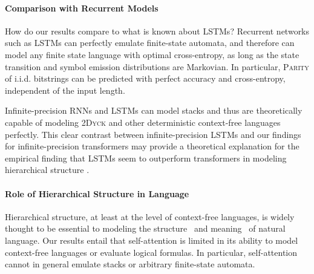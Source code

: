 \documentclass[11pt,a4paper]{article}
\begin{document}



\paragraph{Comparison with Recurrent Models}
How do our results compare to what is known about LSTMs?
Recurrent networks such as LSTMs can perfectly emulate finite-state automata, and therefore can model any finite state language with optimal cross-entropy, as long as the state transition and symbol emission distributions are Markovian.
In particular, \textsc{Parity} of i.i.d. bitstrings can be predicted with perfect accuracy and cross-entropy, independent of the input length.

Infinite-precision RNNs and LSTMs can model stacks \cite{tabor2000fractal,gruning2006stack,kirov2012processing} and thus are theoretically capable of modeling \textsc{2Dyck} and other deterministic context-free languages perfectly. %
This clear contrast between infinite-precision LSTMs and our findings for infinite-precision transformers may provide a theoretical explanation for the empirical finding that LSTMs seem to outperform transformers in modeling hierarchical structure \citep{tran2018importance}.

\paragraph{Role of Hierarchical Structure in Language}
Hierarchical structure, at least at the level of context-free languages, is widely thought to be essential to modeling the structure~\cite{everaert2015structures} and meaning~\cite{montague1973proper} of natural language.
Our results entail that self-attention is limited in its ability to model context-free languages or evaluate logical formulas.
In particular, self-attention cannot in general emulate stacks or arbitrary finite-state automata.
\end{document}
